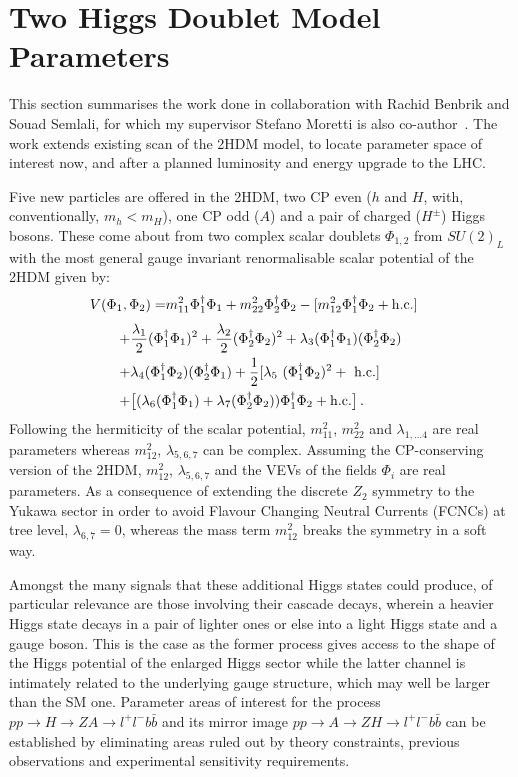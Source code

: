 \section{Two Higgs Doublet Model Parameters}

This section summarises the work done in collaboration with Rachid Benbrik and Souad Semlali, 
for which my supervisor Stefano Moretti is also co-author~\cite{benbrik2020mapping}.
The work extends existing scan of the 2HDM model,
to locate parameter space of interest now, and after
a planned luminosity and energy upgrade to the LHC.

Five new particles are offered in the 2HDM,
two CP even (\(h\) and \(H\), with, conventionally, \(m_h < m_H\)),
one CP odd (\(A\))
and a pair of charged (\(H^\pm\)) Higgs bosons.
These come about from two complex scalar doublets \(\Phi_{1,2}\) from \(SU(2)_L\) with 
the most general gauge invariant renormalisable scalar potential of the 2HDM  given by:
\begin{align}\nonumber
V(\Phi_1,\Phi_2) =& m_{11}^2\Phi_1^\dagger\Phi_1+m_{22}^2\Phi_2^\dagger\Phi_2-[m_{12}^2\Phi_1^\dagger\Phi_2+{\rm h.c.}] \nonumber
\end{align}
\begin{align}
+& \frac{\lambda_1}{2}(\Phi_1^\dagger\Phi_1)^2
+\frac{\lambda_2}{2}(\Phi_2^\dagger\Phi_2)^2
+\lambda_3(\Phi_1^\dagger\Phi_1)(\Phi_2^\dagger\Phi_2)\nonumber\\
+&\lambda_4(\Phi_1^\dagger\Phi_2)(\Phi_2^\dagger\Phi_1) 
+\frac{1}{2}[\lambda_5~(\Phi_1^\dagger\Phi_2)^2 +~{\rm h.c.}]\nonumber\\
+&\big[ (\lambda_6(\Phi_1^\dagger\Phi_1)
+\lambda_7(\Phi_2^\dagger\Phi_2))
\Phi_1^\dagger\Phi_2+{\rm h.c.}\big] \,. \label{pot1}
\end{align}
Following the hermiticity of the scalar potential, \(m_{11}^2\), \(m_{22}^2\) and \(\lambda_{1,\ldots4}\) are real parameters
whereas \(m_{12}^2\), \(\lambda_{5,6,7}\) can be complex.
Assuming the CP-conserving version of the 2HDM, \(m_{12}^2\), \(\lambda_{5,6,7}\) and the VEVs of the fields \(\Phi_i\) are real parameters.
As a consequence of extending the discrete \(Z_2\) symmetry to the Yukawa sector in order to avoid Flavour Changing Neutral Currents (FCNCs) at tree level,
\(\lambda_{6,7}=0\), whereas the mass term \(m_{12}^2\) breaks the symmetry in a soft way.

Amongst the many signals that these additional Higgs states could produce,
of particular relevance are those involving their cascade decays,
wherein a heavier Higgs state decays in a pair of lighter ones or else into a light Higgs state and a gauge boson.
This is the case as the former process gives access to the shape of the Higgs potential of the enlarged Higgs sector
while the latter channel is intimately related to the underlying gauge structure, which may well be larger than the SM one. 
Parameter areas of interest for the process \(pp\to H\to ZA\to l^+l^-b\bar b\)
and its mirror image \(pp\to A \to ZH\to l^+l^-b\bar{b}\) 
can be established by eliminating areas ruled out by theory constraints,
previous observations and experimental sensitivity requirements.


